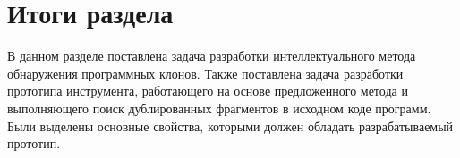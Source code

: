 \section{Итоги раздела}

В данном разделе поставлена задача разработки интеллектуального метода обнаружения программных клонов. Также поставлена задача разработки прототипа инструмента, работающего на основе предложенного метода и выполняющего поиск дублированных фрагментов в исходном коде программ. Были выделены основные свойства, которыми должен обладать разрабатываемый прототип.
% 
% 

